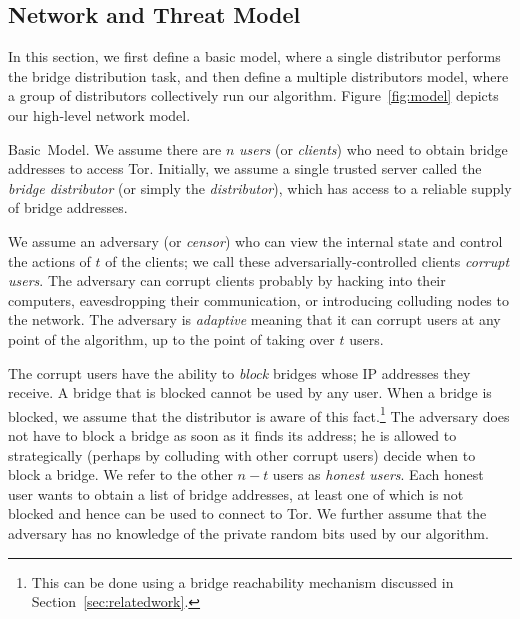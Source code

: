 \documentclass[USenglish,oneside,twocolumn]{article}
\newcommand{\fullpaper}[1]{#1}
\newcommand{\fullpaper}[1]{}
\newcommand{\sfsize}{\fontsize{0.68\baselineskip}{0.68\baselineskip}\selectfont}
\newcommand{\sans}[1]{\textsf{\sfsize \mbox{#1}}}
\newcommand{\para}[1]{\vspace{0.85em} \noindent \sans{{\mbox{#1}}}}
\begin{document}
\subsection{Network and Threat Model} \label{sec:model}

In this section, we first define a basic model, where a single distributor performs the bridge distribution task, and then define a multiple distributors model, where a group of distributors collectively run our algorithm. Figure~\ref{fig:model} depicts our high-level network model.

\para{Basic Model.}
We assume there are $n$ \emph{users} (or \emph{clients}) who need to obtain bridge addresses to access Tor. Initially, we assume a single trusted server called the \emph{bridge distributor} (or simply the \emph{distributor}), which has access to a reliable supply of bridge addresses.%

We assume an adversary (or \emph{censor}) who can view the internal state and control the actions of $t$ of the clients; we call these adversarially-controlled clients \emph{corrupt users}. \fullpaper{The adversary can corrupt clients probably by hacking into their computers, eavesdropping their communication, or introducing colluding nodes to the network.}
The adversary is \emph{adaptive} meaning that it can corrupt users at any point of the algorithm, up to the point of taking over $t$ users.

The corrupt users have the ability to \emph{block} bridges whose IP addresses they receive. A bridge that is blocked cannot be used by any user. When a bridge is blocked, we assume that the distributor is aware of this fact.\footnote{This can be done using a bridge reachability mechanism discussed in Section~\ref{sec:relatedwork}.}
The adversary does not have to block a bridge as soon as it finds its address; he is allowed to strategically (perhaps by colluding with other corrupt users) decide when to block a bridge. 
We refer to the other ${n-t}$ users as \emph{honest users}. Each honest user wants to obtain a list of bridge addresses, at least one of which is not blocked and hence can be used to connect to Tor. 
We further assume that the adversary has no knowledge of the private random bits used by our algorithm.
\end{document}
